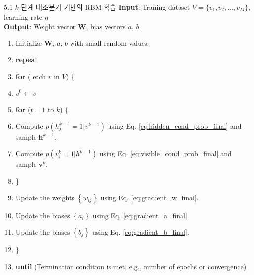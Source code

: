 \documentclass[10pt, a4paper]{article}
\begin{document}
\begin{algorithmbox}{5.1 \quad $k$-단계 대조분기 기반의 RBM 학습}
  \textbf{Input}: Traning dataset $V = \{v_1, v_2, \ldots, v_M\}$, learning rate $\eta$ \\
  \textbf{Output}: Weight vector $\boldsymbol{W}$, bias vectors $a$, $b$

  \begin{enumerate}[leftmargin=1.5em, label=\arabic*.]
    \item Initialize $\boldsymbol{W}$, $a$, $b$ with small random values.
    \item \textbf{repeat}
    \item \quad \textbf{for} ( each $v$ in $V$) \{
    \item \quad\quad $v^0 \leftarrow v$
    \item \quad\quad \textbf{for} ($t = 1$ to $k$) \{
    \item \quad\quad\quad Compute $p(h_j^{k-1} = 1 | v^{k-1})$ using Eq. \eqref{eq:hidden_cond_prob_final}
                          and sample $\mathbf{h}^{k-1}$.
    \item \quad\quad\quad Compute $p(v_i^k = 1 | h^{k-1})$ using Eq. \eqref{eq:visible_cond_prob_final}
                          and sample $\mathbf{v}^k$.
    \item \quad\quad \}
    \item \quad\quad Update the weights $\left\{w_{ij}\right\}$ using Eq. \eqref{eq:gradient_w_final}.
    \item \quad\quad Update the biases $\left\{a_i\right\}$ using Eq. \eqref{eq:gradient_a_final}.
    \item \quad\quad Update the biases $\left\{b_j\right\}$ using Eq. \eqref{eq:gradient_b_final}.
    \item \quad \}
    \item \textbf{until} (Termination condition is met, e.g., number of epochs or convergence)
  \end{enumerate}
\end{algorithmbox}
\end{document}
